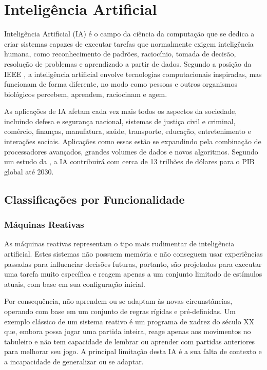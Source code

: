 \section{Inteligência Artificial}
Inteligência Artificial (IA) é o campo da ciência da computação que se dedica a criar sistemas capazes de executar tarefas que normalmente exigem inteligência humana, como reconhecimento de padrões, raciocínio, tomada de decisão, resolução de problemas e aprendizado a partir de dados. Segundo a posição da IEEE \citep{ieee2019ai}, a inteligência artificial envolve tecnologias computacionais inspiradas, mas funcionam de forma diferente, no modo como pessoas e outros organismos biológicos percebem, aprendem, raciocinam e agem.

As aplicações de IA afetam cada vez mais todos os aspectos da sociedade, incluindo defesa e segurança nacional, sistemas de justiça civil e criminal, comércio, finanças, manufatura, saúde, transporte, educação, entretenimento e interações sociais. Aplicações como essas estão se expandindo pela combinação de processadores avançados, grandes volumes de dados e novos algoritmos. Segundo um estudo da \citet{mckinsey2018-ai-impact}, a IA contribuirá com cerca de 13 trilhões de dólares para o PIB global até 2030.

\subsection{Classificações por Funcionalidade}

\subsubsection{Máquinas Reativas}
As máquinas reativas representam o tipo mais rudimentar de inteligência artificial. Estes sistemas não possuem memória e não conseguem usar experiências passadas para influenciar decisões futuras, portanto, são projetados para executar uma tarefa muito específica e reagem apenas a um conjunto limitado de estímulos atuais, com base em sua configuração inicial. 

Por consequência, não aprendem ou se adaptam às novas circunstâncias, operando com base em um conjunto de regras rígidas e pré-definidas. Um exemplo clássico de um sistema reativo é um programa de xadrez do século XX que, embora possa jogar uma partida inteira, reage apenas aos movimentos no tabuleiro e não tem capacidade de lembrar ou aprender com partidas anteriores para melhorar seu jogo. A principal limitação desta IA é a sua falta de contexto e a incapacidade de generalizar ou se adaptar.

